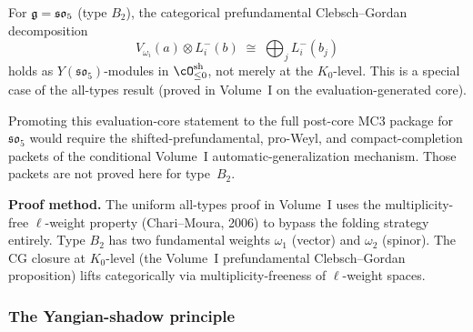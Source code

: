 \begin{remark}%
For $\mathfrak{g} = \mathfrak{so}_5$ \textup{(}type $B_2$\textup{)}, the
categorical prefundamental Clebsch--Gordan decomposition
\begin{equation}%
V_{\omega_i}(a) \otimes L^-_i(b)
\;\cong\;
\bigoplus_j L^-_i(b_j)
\end{equation}
holds as $Y(\mathfrak{so}_5)$-modules in
$\cO^{\mathrm{sh}}_{\leq 0}$, not merely at the $K_0$-level.
This is a special case of the all-types result
\textup{(}proved in Volume~I on the evaluation-generated core\textup{)}.

Promoting this evaluation-core statement to the full post-core MC3
package for $\mathfrak{so}_5$ would require the
shifted-prefundamental, pro-Weyl, and compact-completion packets of
the conditional Volume~I automatic-generalization mechanism. Those packets
are not proved here for type~$B_2$.

\smallskip\noindent
\textbf{Proof method.} The uniform all-types proof
in Volume~I uses the
multiplicity-free $\ell$-weight property (Chari--Moura, 2006)
to bypass the folding strategy entirely. Type $B_2$ has two
fundamental weights $\omega_1$ \textup{(}vector\textup{)} and
$\omega_2$ \textup{(}spinor\textup{)}. The CG closure at
$K_0$-level
\textup{(}the Volume~I prefundamental Clebsch--Gordan proposition\textup{)}
lifts categorically via multiplicity-freeness of $\ell$-weight spaces.
\end{remark}


\subsubsection{The Yangian-shadow principle}

